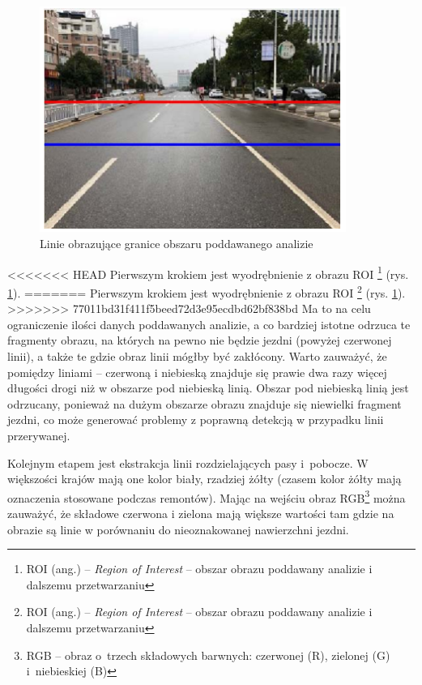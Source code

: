 \begin{figure}
  \centering
  \includegraphics[width=10cm]{img/roi.png}
  \caption{Linie obrazujące granice obszaru poddawanego analizie\cite{T3}}
  \label{fig:roi} 
\end{figure}

<<<<<<< HEAD
Pierwszym krokiem jest wyodrębnienie z obrazu ROI \footnote{ROI (ang.) -- \textit{Region of Interest} -- obszar obrazu poddawany analizie i dalszemu przetwarzaniu} (rys. \ref{fig:roi}). 
=======
Pierwszym krokiem jest wyodrębnienie z obrazu ROI \footnote{ROI (ang.) -- \textit{Region of Interest} -- obszar obrazu poddawany analizie i dalszemu przetwarzaniu} (rys. \ref{fig:roi}). %
>>>>>>> 77011bd31f411f5beed72d3e95ecdbd62bf838bd
Ma to na celu ograniczenie ilości danych poddawanych analizie, a co bardziej istotne odrzuca te fragmenty obrazu, na których na pewno nie będzie jezdni (powyżej czerwonej linii), a także te gdzie obraz linii mógłby być zakłócony. 
Warto zauważyć, że pomiędzy liniami -- czerwoną i niebieską znajduje się prawie dwa razy więcej długości drogi niż w obszarze pod niebieską linią. Obszar pod niebieską linią jest odrzucany, ponieważ na dużym obszarze obrazu znajduje się niewielki fragment jezdni, co może generować problemy z poprawną detekcją w przypadku linii przerywanej.

Kolejnym etapem jest ekstrakcja linii rozdzielających pasy i~pobocze. 
W większości krajów mają one kolor biały, rzadziej żółty (czasem kolor żółty mają oznaczenia stosowane podczas remontów). 
Mając na wejściu obraz RGB\footnote{RGB -- obraz o~trzech składowych barwnych: czerwonej (R), zielonej (G) i~niebieskiej (B)} można zauważyć, że składowe czerwona i zielona mają większe wartości tam gdzie na obrazie są linie w porównaniu do nieoznakowanej nawierzchni jezdni. 

